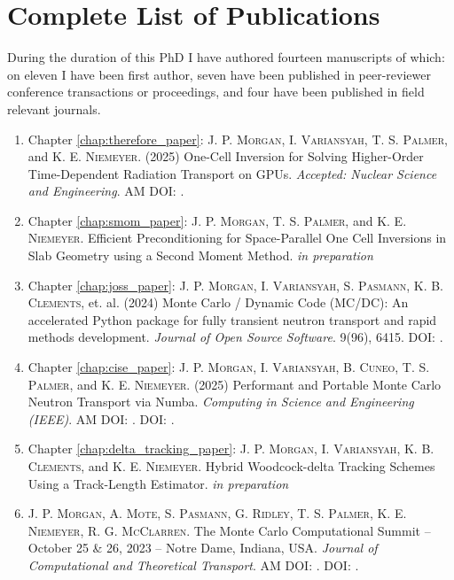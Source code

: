 \chapter{Complete List of Publications}
\label{chap:listopusb}

During the duration of this PhD I have authored fourteen manuscripts of which: on eleven I have been first author, seven have been published in peer-reviewer conference transactions or proceedings, and four have been published in field relevant journals.

\begin{enumerate}
    \item Chapter \ref{chap:therefore_paper}: \textsc{J. P. Morgan}, \textsc{I. Variansyah}, \textsc{T. S. Palmer}, and \textsc{K. E. Niemeyer}. (2025) One-Cell Inversion for Solving Higher-Order Time-Dependent Radiation Transport on GPUs. \emph{Accepted: Nuclear Science and Engineering}. AM DOI: .

    \item Chapter \ref{chap:smom_paper}: \textsc{J. P. Morgan},  \textsc{T. S. Palmer}, and \textsc{K. E. Niemeyer}. Efficient Preconditioning for Space-Parallel One Cell Inversions in Slab Geometry using a Second Moment Method. \emph{in preparation}

    \item Chapter \ref{chap:joss_paper}: \textsc{J. P. Morgan}, \textsc{I. Variansyah}, \textsc{S. Pasmann}, \textsc{K. B. Clements}, et. al. (2024) Monte Carlo / Dynamic Code (MC/DC): An accelerated Python package for fully transient neutron transport and rapid methods development. \emph{Journal of Open Source Software}. 9(96), 6415. DOI: .

    \item Chapter \ref{chap:cise_paper}: \textsc{J. P. Morgan}, \textsc{I. Variansyah}, \textsc{B. Cuneo}, \textsc{T. S. Palmer}, and \textsc{K. E. Niemeyer}. (2025) Performant and Portable Monte Carlo Neutron Transport via Numba. \emph{Computing in Science and Engineering (IEEE)}. AM DOI: . DOI: .

    \item Chapter \ref{chap:delta_tracking_paper}: \textsc{J. P. Morgan}, \textsc{I. Variansyah}, \textsc{K. B. Clements}, and \textsc{K. E. Niemeyer}. Hybrid Woodcock-delta Tracking Schemes Using a Track-Length Estimator. \emph{in preparation}

    \item \textsc{J. P. Morgan}, \textsc{A. Mote}, \textsc{S. Pasmann}, \textsc{ G. Ridley}, \textsc{T. S. Palmer}, \textsc{K. E. Niemeyer}, \textsc{R. G. McClarren}. The Monte Carlo Computational Summit -- October 25 \& 26, 2023 -- Notre Dame, Indiana, USA. \emph{Journal of Computational and Theoretical Transport}. AM DOI: . DOI: .


\end{enumerate}
